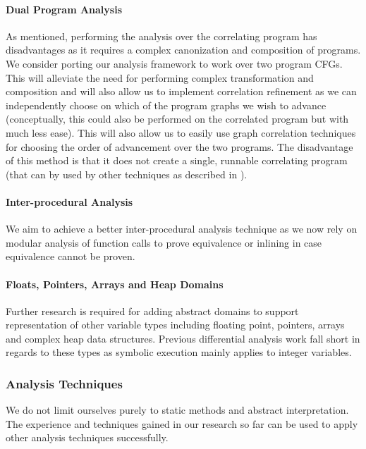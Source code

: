 \paragraph{Dual Program Analysis}
As mentioned, performing the analysis over the correlating program has disadvantages as it requires a complex canonization and composition of programs. We consider porting our analysis framework to work over two program CFGs. This will alleviate the need for performing complex transformation and composition and will also allow us to implement correlation refinement as we can independently choose on which of the program graphs we wish to advance (conceptually, this could also be performed on the correlated program but with much less ease). This will also allow us to easily use graph correlation techniques for choosing the order of advancement over the two programs. The disadvantage of this method is that it does not create a single, runnable correlating program (that can by used by other techniques as described in ).

\paragraph{Inter-procedural Analysis}
We aim to achieve a better inter-procedural analysis technique as we now rely on modular analysis of function calls to prove equivalence or inlining in case equivalence cannot be proven.

\paragraph{Floats, Pointers, Arrays and Heap Domains}
Further research is required for adding abstract domains to support representation of other variable types including floating point, pointers, arrays and complex heap data structures. Previous differential analysis work fall short in regards to these types as symbolic execution mainly applies to integer variables.


\subsubsection{Analysis Techniques}
We do not limit ourselves purely to static methods and abstract interpretation. The experience and techniques gained in our research so far can be used to apply other analysis techniques successfully.

